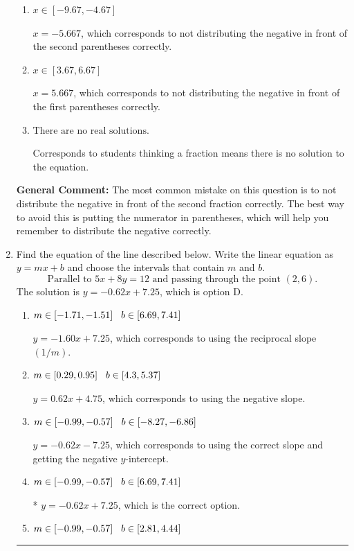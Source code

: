\documentclass{extbook}[14pt]
\newcommand{\litem}[1]{\item #1

\rule{\textwidth}{0.4pt}}
\begin{document}
\begin{enumerate}
{\begin{enumerate}[label=\Alph*.]
* $x = 10.333$, which is the correct option.
\item \( x \in [-9.67, -4.67] \)

$x = -5.667$, which corresponds to not distributing the negative in front of the second parentheses correctly.
\item \( x \in [3.67, 6.67] \)

$x = 5.667$, which corresponds to not distributing the negative in front of the first parentheses correctly.
\item \( \text{There are no real solutions.} \)

Corresponds to students thinking a fraction means there is no solution to the equation.
\end{enumerate}

\textbf{General Comment:} The most common mistake on this question is to not distribute the negative in front of the second fraction correctly. The best way to avoid this is putting the numerator in parentheses, which will help you remember to distribute the negative correctly.
}
\litem{
Find the equation of the line described below. Write the linear equation as $ y=mx+b $ and choose the intervals that contain $m$ and $b$.
\[ \text{Parallel to } 5 x + 8 y = 12 \text{ and passing through the point } (2, 6). \]The solution is \( y = -0.62x + 7.25 \), which is option D.\begin{enumerate}[label=\Alph*.]
\item \( m \in [-1.71, -1.51] \hspace*{3mm} b \in [6.69, 7.41] \)

 $y = -1.60x + 7.25$, which corresponds to using the reciprocal slope $(1/m)$.
\item \( m \in [0.29, 0.95] \hspace*{3mm} b \in [4.3, 5.37] \)

 $y = 0.62x + 4.75$, which corresponds to using the negative slope.
\item \( m \in [-0.99, -0.57] \hspace*{3mm} b \in [-8.27, -6.86] \)

 $y = -0.62x - 7.25$, which corresponds to using the correct slope and getting the negative $y$-intercept.
\item \( m \in [-0.99, -0.57] \hspace*{3mm} b \in [6.69, 7.41] \)

* $y = -0.62x + 7.25$, which is the correct option.
\item \( m \in [-0.99, -0.57] \hspace*{3mm} b \in [2.81, 4.44] \)


\end{enumerate}}
\end{enumerate}
\end{document}
